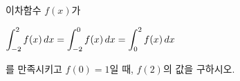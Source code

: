 이차함수 $f(x)$가 \par\smallskip\noindent\hspace*{1.5em}$\displaystyle\int_{-2}^{2} f(x)\mkern3mu dx=\int_{-2}^{0} f(x)\mkern3mu dx=\int_{0}^{2} f(x)\mkern3mu dx$\par\smallskip\noindent 를 만족시키고 $f(0)=1$일 때, $f(2)$의 값을 구하시오.
